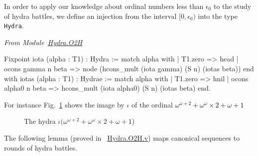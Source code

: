 In order to apply our knowledge about  ordinal numbers less than $\epsilon_0$ to the study of hydra battles, we define an injection
from the interval $[0,\epsilon_0)$ into the type \texttt{Hydra}.

\vspace{4pt}

\emph{From Module~\href{../theories/html/hydras.Hydra.O2H.html}{Hydra.O2H}}


\begin{Coqsrc}
Fixpoint iota (alpha : T1) : Hydra :=
  match alpha with
  | T1.zero => head
  | ocons gamma n beta => 
         node (hcons_mult (iota gamma) (S n) (iotas beta))
  end 
with iotas (alpha : T1) :  Hydrae :=
       match alpha with
       | T1.zero => hnil
       | ocons alpha0 n beta  => 
           hcons_mult (iota alpha0) (S n) (iotas beta)
       end.
\end{Coqsrc}  




For instance Fig.~\ref{fig:iota-example} shows the image by $\iota$ of the ordinal  \textcolor{black}{$\omega^{\omega+2}+\omega^\omega \times 2 + \omega + 1$}

  \begin{figure}[htb]
\centering
{}
\caption{The hydra $\iota(\omega^{\omega+2}+\omega^\omega \times 2 + \omega + 1$) \label{fig:iota-example}}

\end{figure}


The following lemma (proved in ~\href{../theories/html/hydras.Hydra.O2H.html}{Hydra.O2H.v}) maps  canonical sequences to rounds of hydra battles.


